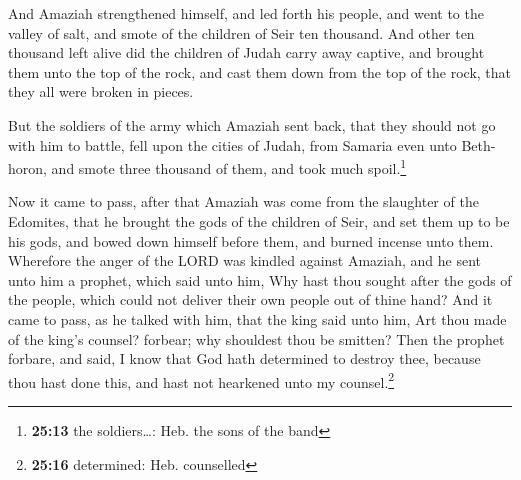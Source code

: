  And Amaziah strengthened himself, and led forth his
people, and went to the valley of salt, and smote of the children of
Seir ten thousand.  And other ten thousand left alive did
the children of Judah carry away captive, and brought them unto the top
of the rock, and cast them down from the top of the rock, that they all
were broken in pieces.

 But the soldiers of the army which Amaziah sent back,
that they should not go with him to battle, fell upon the cities of
Judah, from Samaria even unto Beth-horon, and smote three thousand of
them, and took much spoil.\footnote{\textbf{25:13} the soldiers\ldots:
  Heb. the sons of the band}

 Now it came to pass, after that Amaziah was come from
the slaughter of the Edomites, that he brought the gods of the children
of Seir, and set them up to be his gods, and bowed down himself before
them, and burned incense unto them.  Wherefore the anger
of the LORD was kindled against Amaziah, and he sent unto him a prophet,
which said unto him, Why hast thou sought after the gods of the people,
which could not deliver their own people out of thine hand?
 And it came to pass, as he talked with him, that the
king said unto him, Art thou made of the king's counsel? forbear; why
shouldest thou be smitten? Then the prophet forbare, and said, I know
that God hath determined to destroy thee, because thou hast done this,
and hast not hearkened unto my counsel.\footnote{\textbf{25:16}
  determined: Heb. counselled}

